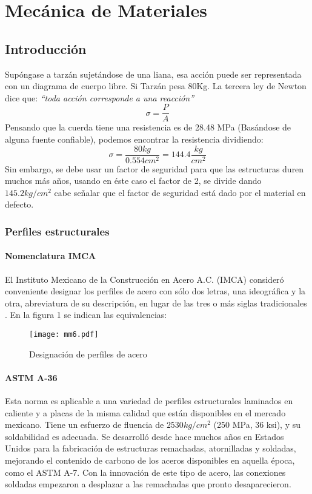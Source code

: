 \chapter{Mecánica de Materiales}
\section{Introducción}

Supóngase a tarzán sujetándose de una liana, esa acción puede ser representada con un diagrama de cuerpo libre. Si Tarzán pesa 80Kg.
La tercera ley de Newton dice que: \emph{``toda acción corresponde a una reacción''}
\begin{equation}
    \sigma = \frac{P}{A}
\end{equation}
Pensando que la cuerda tiene una resistencia es de 28.48 MPa (Basándose de alguna fuente confiable), podemos encontrar la resistencia dividiendo:
\begin{equation*}
    \sigma = \frac{80kg}{0.554cm^2} = 144.4 \frac{kg}{cm^2}
\end{equation*}
Sin embargo, se debe usar un factor de seguridad para que las estructuras duren muchos más años, usando en éste caso el factor de 2, se divide dando $145.2 kg/cm^2$ cabe señalar que el factor de seguridad está dado por el material en defecto.
\subsection{Perfiles estructurales}
\subsubsection{Nomenclatura IMCA}
El Instituto Mexicano de la Construcción en Acero A.C. (IMCA) consideró conveniente
designar los perfiles de acero con sólo dos letras, una ideográfica y la otra, abreviatura de su
descripción, en lugar de las tres o más siglas tradicionales . En la figura 1 se indican las
equivalencias:
\begin{figure}[h!]
\centering
  \texttt{[image: mm6.pdf]}
  \caption{Designación de perfiles de acero}
  \label{mm6}
\end{figure}

\subsubsection{ASTM A-36}

Esta norma es aplicable a una variedad de perfiles estructurales laminados en caliente y a placas de la misma calidad que están disponibles en el mercado mexicano. Tiene un esfuerzo de fluencia de $2530 kg/cm^2$ (250 MPa, 36 ksi), y su soldabilidad es adecuada. Se desarrolló desde hace muchos años en Estados Unidos para la fabricación de estructuras remachadas, atornilladas y soldadas, mejorando el contenido de carbono de los aceros disponibles en aquella época, como el ASTM A-7. Con la innovación de este tipo de acero, las conexiones soldadas empezaron a desplazar a las remachadas que pronto desaparecieron.

